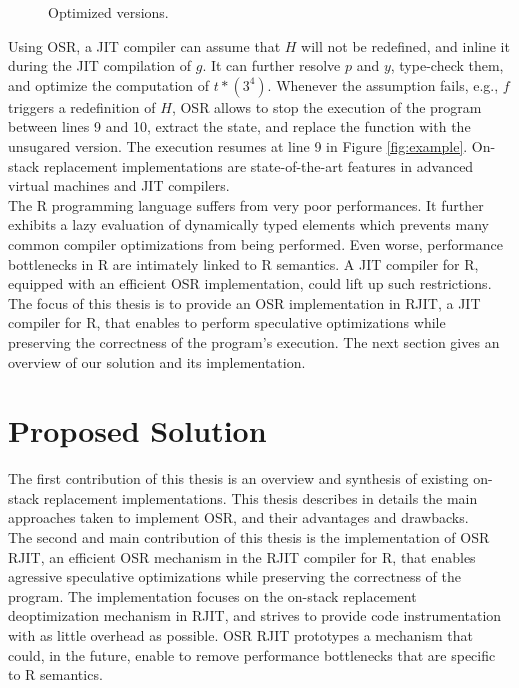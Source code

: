 \begin{wrapfigure}[12]{l}{6.5cm}
\caption{Optimized versions.}
\end{wrapfigure}
Using OSR, a JIT compiler can assume that $H$ will not be redefined, and inline it during the JIT compilation of $g$.
It can further resolve $p$ and $y$, type-check them, and optimize the computation of $t * (3 ^ 4)$.
Whenever the assumption fails, e.g., $f$ triggers a redefinition of $H$, OSR allows to stop the execution of the program between lines 9 and 10, extract the state, and replace the function with the unsugared version.
The execution resumes at line 9 in Figure \ref{fig:example}.
On-stack replacement implementations are state-of-the-art features in advanced virtual machines and JIT compilers.\\


The R programming language suffers from very poor performances. 
It further exhibits a lazy evaluation of dynamically typed elements which prevents many common compiler optimizations from being performed.
Even worse, performance bottlenecks in R are intimately linked to R semantics. 
A JIT compiler for R, equipped with an efficient OSR implementation, could lift up such restrictions.
The focus of this thesis is to provide an OSR implementation in RJIT, a JIT compiler for R, that enables to perform speculative optimizations while preserving the correctness of the program's execution.
The next section gives an overview of our solution and its implementation.\\

\section{Proposed Solution}
The first contribution of this thesis is an overview and synthesis of existing on-stack replacement implementations.
This thesis describes in details the main approaches taken to implement OSR, and their advantages and drawbacks.\\

The second and main contribution of this thesis is the implementation of OSR RJIT, an efficient OSR mechanism in the RJIT compiler for R, that enables agressive speculative optimizations while preserving the correctness of the program.
The implementation focuses on the on-stack replacement deoptimization mechanism in RJIT, and strives to provide code instrumentation with as little overhead as possible.
OSR RJIT prototypes a mechanism that could, in the future, enable to remove performance bottlenecks that are specific to R semantics.\\

